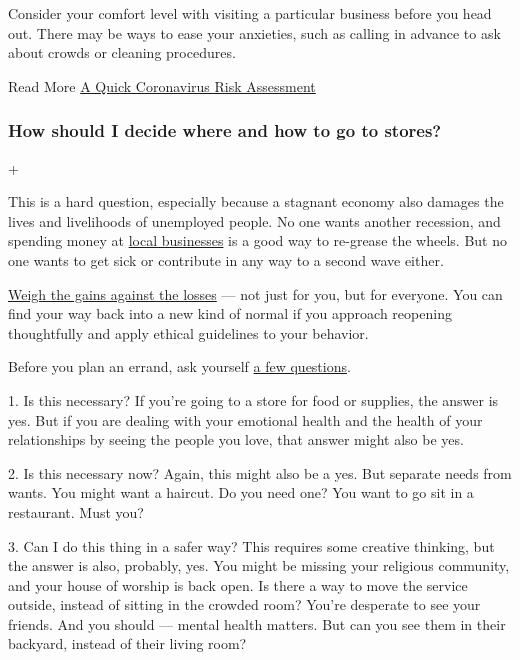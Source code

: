 Consider your comfort level with visiting a particular business before
you head out. There may be ways to ease your anxieties, such as calling
in advance to ask about crowds or cleaning procedures.

 Read More
\href{https://www.nytimes.com/interactive/2020/06/03/burst/coronavirus-risk-gym-surfaces-bike.html}{A
Quick Coronavirus Risk Assessment}

\hypertarget{how-should-i-decide-where-and-how-to-go-to-stores}{%
\subsubsection{How should I decide where and how to go to
stores?}\label{how-should-i-decide-where-and-how-to-go-to-stores}}

+

This is a hard question, especially because a stagnant economy also
damages the lives and livelihoods of unemployed people. No one wants
another recession, and spending money at
\href{https://www.nytimes.com/2020/06/18/business/small-business-reopening-coronavirus.html}{local
businesses} is a good way to re-grease the wheels. But no one wants to
get sick or contribute in any way to a second wave either.

\href{https://www.nytimes.com/2020/04/08/dining/takeout-restaurant-ethics-coronavirus.html}{Weigh
the gains against the losses} --- not just for you, but for everyone.
You can find your way back into a new kind of normal if you approach
reopening thoughtfully and apply ethical guidelines to your behavior.

Before you plan an errand, ask yourself
\href{https://www.nytimes.com/interactive/2020/05/06/opinion/coronavirus-us-reopen.html}{a
few questions}.

1. Is this necessary? If you're going to a store for food or supplies,
the answer is yes. But if you are dealing with your emotional health and
the health of your relationships by seeing the people you love, that
answer might also be yes.

2. Is this necessary now? Again, this might also be a yes. But separate
needs from wants. You might want a haircut. Do you need one? You want to
go sit in a restaurant. Must you?

3. Can I do this thing in a safer way? This requires some creative
thinking, but the answer is also, probably, yes. You might be missing
your religious community, and your house of worship is back open. Is
there a way to move the service outside, instead of sitting in the
crowded room? You're desperate to see your friends. And you should ---
mental health matters. But can you see them in their backyard, instead
of their living room?

